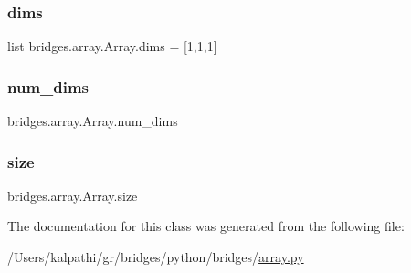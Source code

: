 \subsubsection{\texorpdfstring{dims}{dims}}
{\footnotesize\ttfamily list bridges.\+array.\+Array.\+dims = \mbox{[}1,1,1\mbox{]}\hspace{0.3cm}{\ttfamily [static]}}

\mbox{\label{classbridges_1_1array_1_1_array_a2c28c3658312289dc2ae78f4099d4c76}} 
\subsubsection{\texorpdfstring{num\_dims}{num\_dims}}
{\footnotesize\ttfamily bridges.\+array.\+Array.\+num\+\_\+dims}

\mbox{\label{classbridges_1_1array_1_1_array_aeac1b1639d0284500f354d41b40c38f7}} 
\subsubsection{\texorpdfstring{size}{size}}
{\footnotesize\ttfamily bridges.\+array.\+Array.\+size}



The documentation for this class was generated from the following file\+:\begin{DoxyCompactItemize}
\item 
/\+Users/kalpathi/gr/bridges/python/bridges/\mbox{\hyperlink{array_8py}{array.\+py}}\end{DoxyCompactItemize}
